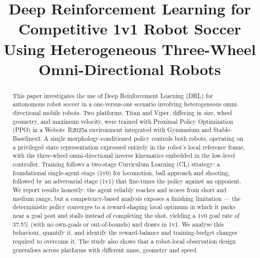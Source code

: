\documentclass[conference]{IEEEtran}
\begin{document}
\title{Deep Reinforcement Learning for Competitive 1v1 Robot Soccer Using
Heterogeneous Three-Wheel Omni-Directional Robots}

\author{
\and
{}
\and
{}
\and
{}
}
\maketitle

\begin{abstract}
This paper investigates the use of Deep Reinforcement Learning (DRL) for
autonomous robot soccer in a one-versus-one scenario involving heterogeneous
omni-directional mobile robots. Two platforms, Titan and Viper, differing in
size, wheel geometry, and maximum velocity, were trained with Proximal Policy
Optimization (PPO) in a Webots~R2025a environment integrated with Gymnasium and
Stable-Baselines3. A single morphology-conditioned policy controls both robots,
operating on a privileged state representation expressed entirely in the robot's
local reference frame, with the three-wheel omni-directional inverse kinematics
embedded in the low-level controller. Training follows a two-stage Curriculum
Learning (CL) strategy: a foundational single-agent stage (1v0) for locomotion,
ball approach and shooting, followed by an adversarial stage (1v1) that
fine-tunes the policy against an opponent. We report results honestly: the agent
reliably reaches and scores from short and medium range, but a competency-based
analysis exposes a finishing limitation — the deterministic policy converges to a
reward-shaping local optimum in which it parks near a goal post and stalls instead
of completing the shot, yielding a 1v0 goal rate of 37.5\% (with no own-goals or
out-of-bounds) and draws in 1v1. We analyse this behaviour, quantify it, and
identify the reward-balance and training-budget changes required to overcome it.
The study also shows that a robot-local observation design generalises across
platforms with different mass, geometry and speed.
\end{abstract}
\end{document}
